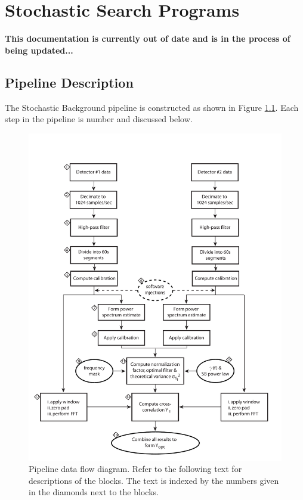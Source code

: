 
\chapter{Stochastic Search Programs}
\label{chapter:stochastic}

\clearpage


\clearpage

\noindent\textbf{This documentation is currently out of date and is in
	the process of being updated...}

\section{Pipeline Description}

The Stochastic Background pipeline is constructed as shown in Figure
\ref{fig:stoch_blockdigram}. Each step in the pipeline is number and
discussed below.

\begin{figure}[htb!]
\begin{center}
\includegraphics[width=5in]{figures/stochastic_flowdiagram}
\caption{Pipeline data flow diagram. Refer to the following text for
descriptions of the blocks. The text is indexed by the numbers given
in the diamonds next to the blocks.}
\label{fig:stoch_blockdigram}
\end{center}
\end{figure}

